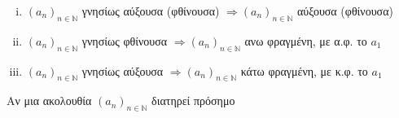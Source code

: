 \documentclass[main.tex]{subfiles}
\begin{document}
\begin{rems}
\item {}
    \begin{enumerate}[i)]
        \item $ (a_{n})_{n \in \mathbb{N}} $ γνησίως αύξουσα (φθίνουσα) $ 
            \Rightarrow (a_{n})_{n \in \mathbb{N}} $ αύξουσα (φθίνουσα) 
        \item $ (a_{n})_{n \in \mathbb{N}} $ γνησίως φθίνουσα  $ 
            \Rightarrow (a_{n})_{n \in \mathbb{N}} $ ανω φραγμένη, με 
            α.φ. το $ a_{1} $  
        \item $ (a_{n})_{n \in \mathbb{N}} $ γνησίως αύξουσα  $ 
            \Rightarrow (a_{n})_{n \in \mathbb{N}} $ κάτω φραγμένη, με 
            κ.φ. το $ a_{1} $  
    \end{enumerate}
\end{rems}

\begin{dfn}
    Αν μια ακολουθία $ (a_{n})_{n \in \mathbb{N}} $ διατηρεί πρόσημο
    
\end{dfn}
\end{document}
